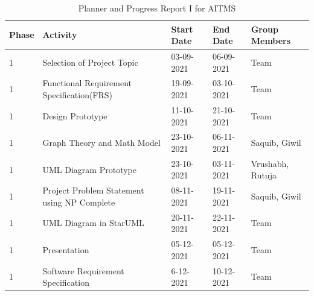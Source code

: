 \documentclass[openany,12pt]{report}
\begin{document}
	\newpage
	\begin{table} [htb]
		\centering
		\begin{tabular}{| p{1.2 cm}| p{5 cm}| p{2.5 cm}| p{2.5 cm}| p{3 cm}| }\hline
			\textbf{Phase}	&\textbf{Activity}	&\textbf{Start Date}	&\textbf{End Date} &\textbf{Group Members}\\\hline\hline
			1 &Selection of Project Topic	&03-09-2021 	&06-09-2021 &Team \\\hline
			1 &Functional Requirement Specification(FRS) &19-09-2021 &03-10-2021 &Team\\\hline
			1 &Design Prototype &11-10-2021 &21-10-2021 &Team\\\hline
			1 &Graph Theory and Math Model &23-10-2021 &06-11-2021 & Saquib, Giwil\\\hline
			1 &UML Diagram Prototype &23-10-2021 &03-11-2021 &Vrushabh, \newline Rutuja \\\hline
			1 &Project Problem Statement using NP Complete &08-11-2021 &19-11-2021 &Saquib, Giwil\\\hline
			1 &UML Diagram in StarUML &20-11-2021 &22-11-2021 &Team \\\hline
			1 &Presentation &05-12-2021 &05-12-2021 &Team \\\hline
			1 &Software Requirement Specification &6-12-2021 &10-12-2021 &Team \\\hline
		\end{tabular}
		\caption{Planner and Progress Report I for AITMS}
		\label{tab:nnwork}
	\end{table}
\end{document}
